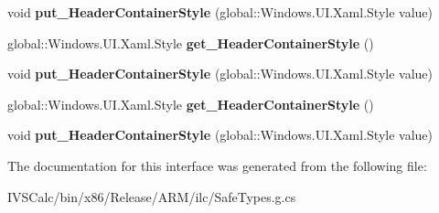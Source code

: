\begin{DoxyCompactItemize}
\item 
\mbox{\label{interface_windows_1_1_u_i_1_1_xaml_1_1_controls_1_1_i_group_style2_a72375c64441c2b8ec3635acc1a543f48}} 
void {\bfseries put\+\_\+\+Header\+Container\+Style} (global\+::\+Windows.\+U\+I.\+Xaml.\+Style value)
\item 
\mbox{\label{interface_windows_1_1_u_i_1_1_xaml_1_1_controls_1_1_i_group_style2_a2c6805d01c81929429b03b0ac0b70db1}} 
global\+::\+Windows.\+U\+I.\+Xaml.\+Style {\bfseries get\+\_\+\+Header\+Container\+Style} ()
\item 
\mbox{\label{interface_windows_1_1_u_i_1_1_xaml_1_1_controls_1_1_i_group_style2_a72375c64441c2b8ec3635acc1a543f48}} 
void {\bfseries put\+\_\+\+Header\+Container\+Style} (global\+::\+Windows.\+U\+I.\+Xaml.\+Style value)
\item 
\mbox{\label{interface_windows_1_1_u_i_1_1_xaml_1_1_controls_1_1_i_group_style2_a2c6805d01c81929429b03b0ac0b70db1}} 
global\+::\+Windows.\+U\+I.\+Xaml.\+Style {\bfseries get\+\_\+\+Header\+Container\+Style} ()
\item 
\mbox{\label{interface_windows_1_1_u_i_1_1_xaml_1_1_controls_1_1_i_group_style2_a72375c64441c2b8ec3635acc1a543f48}} 
void {\bfseries put\+\_\+\+Header\+Container\+Style} (global\+::\+Windows.\+U\+I.\+Xaml.\+Style value)
\end{DoxyCompactItemize}


The documentation for this interface was generated from the following file\+:\begin{DoxyCompactItemize}
\item 
I\+V\+S\+Calc/bin/x86/\+Release/\+A\+R\+M/ilc/Safe\+Types.\+g.\+cs\end{DoxyCompactItemize}

